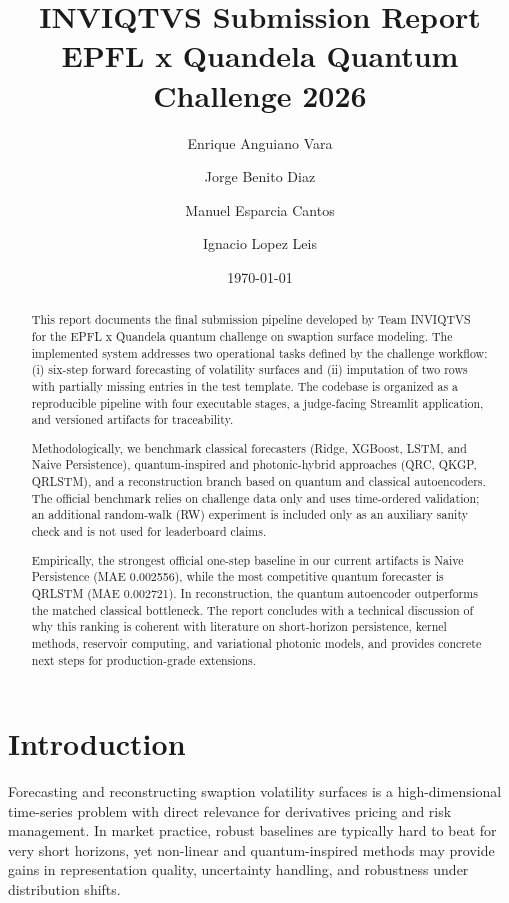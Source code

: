 \documentclass[11pt]{article}
\title{INVIQTVS Submission Report\\
\large EPFL x Quandela Quantum Challenge 2026}
\author{
Enrique Anguiano Vara \and
Jorge Benito Diaz \and
Manuel Esparcia Cantos \and
Ignacio Lopez Leis
}
\date{\today}
\begin{document}
\maketitle

\begin{abstract}
This report documents the final submission pipeline developed by Team INVIQTVS for the EPFL x Quandela quantum challenge on swaption surface modeling. The implemented system addresses two operational tasks defined by the challenge workflow: (i) six-step forward forecasting of volatility surfaces and (ii) imputation of two rows with partially missing entries in the test template. The codebase is organized as a reproducible pipeline with four executable stages, a judge-facing Streamlit application, and versioned artifacts for traceability.

Methodologically, we benchmark classical forecasters (Ridge, XGBoost, LSTM, and Naive Persistence), quantum-inspired and photonic-hybrid approaches (QRC, QKGP, QRLSTM), and a reconstruction branch based on quantum and classical autoencoders. The official benchmark relies on challenge data only and uses time-ordered validation; an additional random-walk (RW) experiment is included only as an auxiliary sanity check and is not used for leaderboard claims.

Empirically, the strongest official one-step baseline in our current artifacts is Naive Persistence (MAE 0.002556), while the most competitive quantum forecaster is QRLSTM (MAE 0.002721). In reconstruction, the quantum autoencoder outperforms the matched classical bottleneck. The report concludes with a technical discussion of why this ranking is coherent with literature on short-horizon persistence, kernel methods, reservoir computing, and variational photonic models, and provides concrete next steps for production-grade extensions.
\end{abstract}

\section{Introduction}
Forecasting and reconstructing swaption volatility surfaces is a high-dimensional time-series problem with direct relevance for derivatives pricing and risk management. In market practice, robust baselines are typically hard to beat for very short horizons, yet non-linear and quantum-inspired methods may provide gains in representation quality, uncertainty handling, and robustness under distribution shifts.
\end{document}
